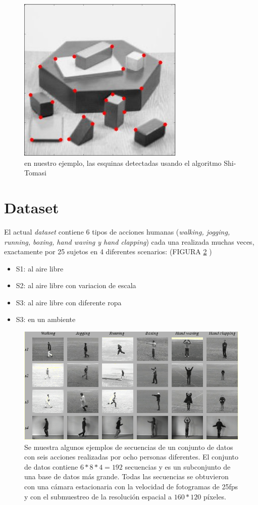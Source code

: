 \begin{figure}[h!]
\centering
\includegraphics[width=0.6\linewidth]{Kap3/img/shitomasi_block_corner.jpg}
\caption{ en nuestro ejemplo, las esquinas detectadas usando el algoritmo Shi-Tomasi}
\label{fig:ShiTomasiCorner}
\end{figure}


\section{Dataset}

El actual \textit{dataset} \cite{data_set_KTH_baumann2016recognizing} contiene 6 tipos de acciones humanas (\textit{walking, jogging, running, boxing, hand waving y hand clapping}) cada una realizada muchas veces, exactamente por 25 sujetos en 4 diferentes scenarios: (FIGURA \ref{fig:datasetKth} )
\begin{itemize}
\item S1: al aire libre
\item S2: al aire libre con variacion de escala
\item S3: al aire libre con diferente ropa
\item S3: en un ambiente 
\end{itemize}

\begin{figure}[h!]
\centering
\includegraphics[width=0.6\linewidth]{Kap3/img/datasetKth.png}
\caption{ Se muestra algunos ejemplos de secuencias de un conjunto de datos con seis acciones realizadas por ocho personas diferentes. El conjunto de datos contiene $6*8*4=192$ secuencias y es un subconjunto de una base de datos más grande. Todas las secuencias se obtuvieron con una cámara estacionaria con la velocidad de fotogramas de 25fps y con el submuestreo de la resolución espacial a $160*120$ píxeles.}
\label{fig:datasetKth}
\end{figure}
    
